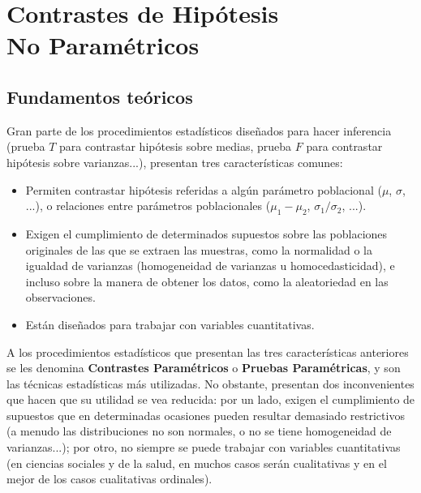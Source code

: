 
\chapter[Contrastes de hipótesis no paramétricos]{Contrastes de Hipótesis\\ No Paramétricos}


\section{Fundamentos teóricos}
Gran parte de los procedimientos estadísticos diseñados para hacer inferencia (prueba $T$ para contrastar hipótesis sobre medias, prueba $F$
para contrastar hipótesis sobre varianzas...), presentan tres características comunes:

\begin{itemize}
\item Permiten contrastar hipótesis referidas a algún parámetro poblacional ($\mu$, $\sigma$, ...), o relaciones entre parámetros
poblacionales ($\mu_1-\mu_2$, $\sigma_1/\sigma_2$, ...).

\item Exigen el cumplimiento de determinados supuestos sobre las poblaciones originales de las que se extraen las muestras, como la
normalidad o la igualdad de varianzas (homogeneidad de varianzas u homocedasticidad), e incluso sobre la manera de obtener los datos, como
la aleatoriedad en las observaciones.

\item Están diseñados para trabajar con variables cuantitativas.
\end{itemize}

A los procedimientos estadísticos que presentan las tres características anteriores se les denomina \textbf{Contrastes Paramétricos} o
\textbf{Pruebas Paramétricas}, y son las técnicas estadísticas más utilizadas. No obstante, presentan dos inconvenientes que hacen que su
utilidad se vea reducida: por un lado, exigen el cumplimiento de supuestos que en determinadas ocasiones pueden resultar demasiado
restrictivos (a menudo las distribuciones no son normales, o no se tiene homogeneidad de varianzas...); por otro, no siempre se puede
trabajar con variables cuantitativas (en ciencias sociales y de la salud, en muchos casos serán cualitativas y en el mejor de los casos
cualitativas ordinales).


